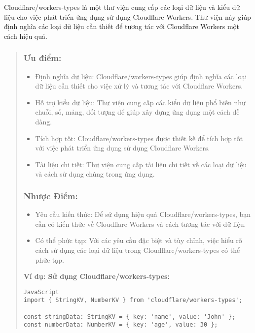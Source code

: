 Cloudflare/workers-types là một thư viện cung cấp các loại dữ liệu và kiểu dữ liệu cho việc phát triển ứng dụng sử dụng Cloudflare Workers. Thư viện này giúp định nghĩa các loại dữ liệu cần thiết để tương tác với Cloudflare Workers một cách hiệu quả.

\begin{quote}
\subsubsection{Ưu điểm:}
\begin{itemize}
  \item Định nghĩa dữ liệu: Cloudflare/workers-types giúp định nghĩa các loại dữ liệu cần thiết cho việc xử lý và tương tác với Cloudflare Workers.
  \item Hỗ trợ kiểu dữ liệu: Thư viện cung cấp các kiểu dữ liệu phổ biến như chuỗi, số, mảng, đối tượng để giúp xây dựng ứng dụng một cách dễ dàng.
  \item Tích hợp tốt: Cloudflare/workers-types được thiết kế để tích hợp tốt với việc phát triển ứng dụng sử dụng Cloudflare Workers.
  \item Tài liệu chi tiết: Thư viện cung cấp tài liệu chi tiết về các loại dữ liệu và cách sử dụng chúng trong ứng dụng.
\end{itemize}

\subsubsection{Nhược Điểm:}
\begin{itemize}
  \item Yêu cầu kiến thức: Để sử dụng hiệu quả Cloudflare/workers-types, bạn cần có kiến thức về Cloudflare Workers và cách tương tác với dữ liệu.
  \item Có thể phức tạp: Với các yêu cầu đặc biệt và tùy chỉnh, việc hiểu rõ cách sử dụng các loại dữ liệu trong Cloudflare/workers-types có thể phức tạp.
\end{itemize}

\textbf{Ví dụ: Sử dụng Cloudflare/workers-types:}
\begin{lstlisting}
JavaScript
import { StringKV, NumberKV } from 'cloudflare/workers-types';

const stringData: StringKV = { key: 'name', value: 'John' };
const numberData: NumberKV = { key: 'age', value: 30 };
\end{lstlisting}
\end{quote}



